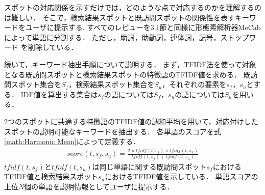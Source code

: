 \documentclass{deimj}
\begin{document}


スポットの対応関係を示すだけでは，どのような点で対応するのかを理解するのは難しい．
そこで，検索結果スポットと既訪問スポットの関係性を表すキーワードをユーザに提示する.
すべてのレビューを3.1節と同様に形態素解析器MeCabによって単語に分割する．
ただし，助詞，助動詞，連体詞，記号，ストップワード を削除している．

続いて，キーワード抽出手順について説明する．
まず，TFIDF法を使って対象となる既訪問スポットと検索結果スポットの特徴語のTFIDF値を求める．
既訪問スポット集合を$S_f$，検索結果スポット集合を$S_u$，それぞれの要素を$s_f$，$s_u$とする．
IDF値を算出する集合は$s_f$の語については$S_f$，$s_u$の語については$S_u$を用いる．

2つのスポットに共通する特徴語のTFIDF値の調和平均を用いて，対応付けしたスポットの説明可能なキーワードを抽出する．
各単語のスコアを式\ref{math:Harmonic Mean}によって定義する．
\begin{eqnarray}
  score(t,s_f,s_u) = \frac{2 \times tfidf(t,s_f) \times tfidf(t,s_u)}{tfidf(t,s_f) + tfidf(t,s_u)}
  \label{math:Harmonic Mean}
\end{eqnarray}
$tfidf(t,s_f)$と$tfidf(t,s_u)$は同じ単語に関する既訪問スポット$s_f$におけるTFIDF値と検索結果スポット$s_u$におけるTFIDF値を示している．
単語スコアの上位$N$個の単語を説明情報としてユーザに提示する． 

\end{document}
